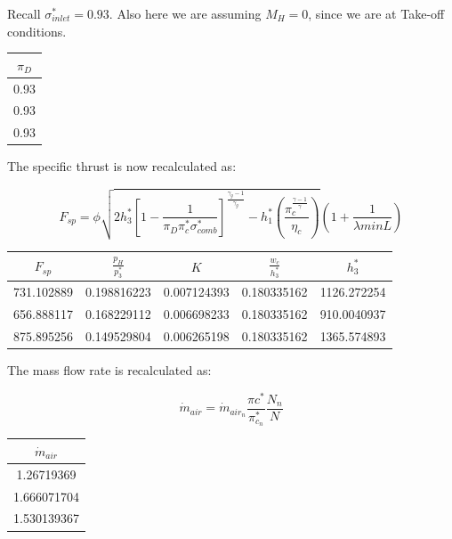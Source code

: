 \documentclass[titlepage]{article}
\begin{document}
Recall $\sigma_{inlet}^{*} = 0.93$. Also here we are assuming $M_{H} = 0$, since we are at Take-off conditions.

\begin{center}
  \begin{tabular}{|c|}
    \hline
    $\pi_{D}$ \\
    \hline
    0.93 \\
    \hline
    0.93 \\
    \hline
    0.93 \\
    \hline
  \end{tabular}
\end{center}

The specific thrust is now recalculated as:

\begin{equation}
  F_{sp} = \phi \sqrt{2h_{3}^{*}\left[1 - \frac{1}{\pi_{D} \pi_{c}^{*} \sigma_{comb}^{*}}\right]^{\frac{\gamma_{g}-1}{\gamma_{g}}} - h_{1}^{*}\left(\frac{\pi_{c}^{\frac{\gamma-1}{\gamma}}}{\eta_{c}}\right)} \left(1+\frac{1}{\lambda minL}\right)
\end{equation}

\begin{center}
  \begin{tabular}{|c|c|c|c|c|}
    \hline
    $F_{sp}$ & $\frac{p_{H}}{p_{3}^{*}}$ & $K$ & $\frac{w_{c}}{h_{3}^{*}}$ & $h_{3}^{*}$ \\
    \hline
    731.102889 & 0.198816223	& 0.007124393 &	0.180335162	& 1126.272254 \\
    \hline
    656.888117 & 0.168229112	& 0.006698233	& 0.180335162	& 910.0040937 \\
    \hline
    875.895256 & 0.149529804 & 0.006265198	& 0.180335162	& 1365.574893 \\
    \hline
  \end{tabular}
\end{center}

The mass flow rate is recalculated as:

\begin{equation}
  \dot{m}_{air} = \dot{m}_{air_{n}} \frac{\pi{c}^{*}}{\pi_{c_{n}}^{*}} \frac{N_{n}}{N}
\end{equation}

\begin{center}
  \begin{tabular}{|c|}
    \hline
    $\dot{m}_{air}$ \\
    \hline
    1.26719369 \\
    \hline
    1.666071704 \\
    \hline
    1.530139367 \\
    \hline
  \end{tabular}
\end{center}
\end{document}
